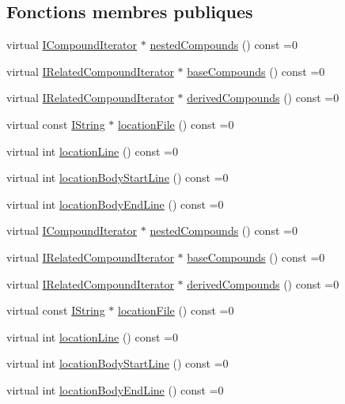 \subsection*{Fonctions membres publiques}
\begin{DoxyCompactItemize}
\item 
virtual \hyperlink{class_i_compound_iterator}{I\+Compound\+Iterator} $\ast$ \hyperlink{class_i_struct_aa3fe83fbc1d910f6fb731aba09cdf9ee}{nested\+Compounds} () const  =0
\item 
virtual \hyperlink{class_i_related_compound_iterator}{I\+Related\+Compound\+Iterator} $\ast$ \hyperlink{class_i_struct_acc188d29618e850eb524a27f0f9aeafa}{base\+Compounds} () const  =0
\item 
virtual \hyperlink{class_i_related_compound_iterator}{I\+Related\+Compound\+Iterator} $\ast$ \hyperlink{class_i_struct_a60f38c0999bed27660bfe4828fd977b2}{derived\+Compounds} () const  =0
\item 
virtual const \hyperlink{class_i_string}{I\+String} $\ast$ \hyperlink{class_i_struct_a62e019518da4f67e0b4d881e9762bc3f}{location\+File} () const  =0
\item 
virtual int \hyperlink{class_i_struct_a06494b5bfd7749da80bec76c27a98dac}{location\+Line} () const  =0
\item 
virtual int \hyperlink{class_i_struct_a6658464db88e78e26f4df3913ae96f84}{location\+Body\+Start\+Line} () const  =0
\item 
virtual int \hyperlink{class_i_struct_ad847ae76f73a2b74c14cba06464c47e2}{location\+Body\+End\+Line} () const  =0
\item 
virtual \hyperlink{class_i_compound_iterator}{I\+Compound\+Iterator} $\ast$ \hyperlink{class_i_struct_aa3fe83fbc1d910f6fb731aba09cdf9ee}{nested\+Compounds} () const  =0
\item 
virtual \hyperlink{class_i_related_compound_iterator}{I\+Related\+Compound\+Iterator} $\ast$ \hyperlink{class_i_struct_acc188d29618e850eb524a27f0f9aeafa}{base\+Compounds} () const  =0
\item 
virtual \hyperlink{class_i_related_compound_iterator}{I\+Related\+Compound\+Iterator} $\ast$ \hyperlink{class_i_struct_a60f38c0999bed27660bfe4828fd977b2}{derived\+Compounds} () const  =0
\item 
virtual const \hyperlink{class_i_string}{I\+String} $\ast$ \hyperlink{class_i_struct_a62e019518da4f67e0b4d881e9762bc3f}{location\+File} () const  =0
\item 
virtual int \hyperlink{class_i_struct_a06494b5bfd7749da80bec76c27a98dac}{location\+Line} () const  =0
\item 
virtual int \hyperlink{class_i_struct_a6658464db88e78e26f4df3913ae96f84}{location\+Body\+Start\+Line} () const  =0
\item 
virtual int \hyperlink{class_i_struct_ad847ae76f73a2b74c14cba06464c47e2}{location\+Body\+End\+Line} () const  =0
\end{DoxyCompactItemize}
